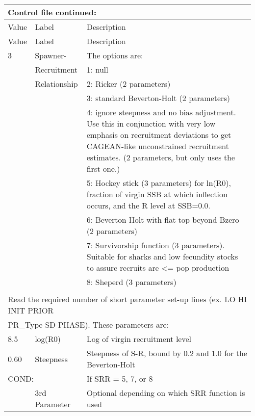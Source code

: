 \begin{center}
	\begin{longtable}{p{1cm} p{3cm} p{11cm}}
		\multicolumn{3}{l}{Control file continued:}\\
		\hline
		Value & Label &  Description\\
		\hline
		\endfirsthead

		\hline
		Value & Label &  Description\\
		\hline
		\endhead

		\endfoot
		\endlastfoot

		3 & Spawner-            & The options are: \\
		  & Recruitment         & 1: null \\
		  & Relationship        & 2:  Ricker (2 parameters) \\
		  &                     & 3:  standard Beverton-Holt (2 parameters) \\
		  &                     & 4:  ignore steepness and no bias adjustment.  Use this in conjunction with very low emphasis on recruitment deviations to get CAGEAN-like unconstrained recruitment estimates. (2 parameters, but only uses the first one.)\\
		  &                     & 5:  Hockey stick (3 parameters) for ln(R0), fraction of virgin SSB at which inflection occurs, and the R level at SSB=0.0.\\
		  &                     & 6:  Beverton-Holt with flat-top beyond Bzero (2 parameters)\\
		  &                     & 7:  Survivorship function (3 parameters).  Suitable for sharks and low fecundity stocks to assure recruits are <= pop production \\
	      &                     & 8:  Sheperd (3 parameters)\\
		\hline
		\\
		\multicolumn{3}{l}{Read the required number of short parameter set-up lines (ex. LO HI INIT PRIOR }\\
		\multicolumn{3}{l}{PR\_Type SD PHASE).  These parameters are:}\\
		\hline
		8.5 & log(R0) & Log of virgin recruitment level \\
		\hline
		0.60 & Steepness  & Steepness of S-R, bound by 0.2 and 1.0 for the Beverton-Holt \\
		\hline
		\multicolumn{2}{l}{COND:} & If SRR = 5, 7, or 8\\
		& 3rd Parameter & Optional depending on which SRR function is used \\

\end{longtable}
\end{center}
